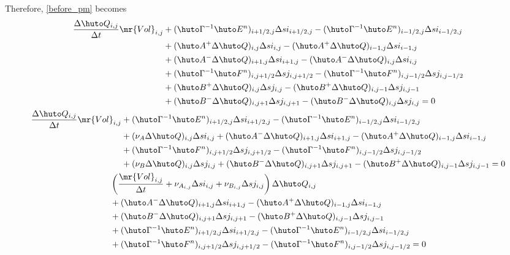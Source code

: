 \documentclass{jsarticle}
\newcommand{\bQ}{\huto Q}
\newcommand{\bE}{\huto E}
\newcommand{\bF}{\huto F}
\newcommand{\bA}{\huto A}
\newcommand{\bB}{\huto B}
\newcommand{\bG}{\huto \Gamma}
\newcommand{\Vol}{\mr{Vol}}
\begin{document}
Therefore, \eqref{before_pm} becomes
\begin{gather}
\begin{split}
\frac{\Delta \bQ _{i,j}}{\Delta t} \Vol _{i,j}
&+ (\bG ^{-1} \bE^n)_{i+1/2,j}\Delta si_{i+1/2,j} - (\bG ^{-1} \bE^n)_{i-1/2,j}\Delta si_{i-1/2,j}\\
&+ (\bA^+\Delta \bQ)_{i,  j}\Delta si_{i,  j} - (\bA^+\Delta \bQ)_{i-1,j}\Delta si_{i-1,j}\\
&+ (\bA^-\Delta \bQ)_{i+1,j}\Delta si_{i+1,j} - (\bA^-\Delta \bQ)_{i,  j}\Delta si_{i,  j}\\
&+ (\bG ^{-1} \bF^n)_{i,j+1/2}\Delta sj_{i,j+1/2} - (\bG ^{-1} \bF^n)_{i,j-1/2}\Delta sj_{i,j-1/2}\\
&+ (\bB^+\Delta \bQ)_{i,j  }\Delta sj_{i,j  } - (\bB^+\Delta \bQ)_{i,j-1}\Delta sj_{i,j-1}\\
&+ (\bB^-\Delta \bQ)_{i,j+1}\Delta sj_{i,j+1} - (\bB^-\Delta \bQ)_{i,j  }\Delta sj_{i,j  }=0\\
\end{split}\\
\begin{split}
\frac{\Delta \bQ _{i,j}}{\Delta t} \Vol _{i,j}
&+ (\bG ^{-1} \bE^n)_{i+1/2,j}\Delta si_{i+1/2,j} - (\bG ^{-1} \bE^n)_{i-1/2,j}\Delta si_{i-1/2,j}\\
&+ (\nu _A\Delta \bQ)_{i,  j}\Delta si_{i,  j} + (\bA^-\Delta \bQ)_{i+1,j}\Delta si_{i+1,j} - (\bA^+\Delta \bQ)_{i-1,j}\Delta si_{i-1,j}\\
&+ (\bG ^{-1} \bF^n)_{i,j+1/2}\Delta sj_{i,j+1/2} - (\bG ^{-1} \bF^n)_{i,j-1/2}\Delta sj_{i,j-1/2}\\
&+ (\nu _B\Delta \bQ)_{i,j  }\Delta sj_{i,j  } + (\bB^-\Delta \bQ)_{i,j+1}\Delta sj_{i,j+1} - (\bB^+\Delta \bQ)_{i,j-1}\Delta sj_{i,j-1}=0
\end{split}\\
\begin{split}
&\left( \frac{\Vol _{i,j}}{\Delta t} + \nu _{A_{i,j}}\Delta si_{i,j} + \nu _{B_{i,j  }}\Delta sj_{i,j  }\right) \Delta \bQ _{i,j}\\
&+ (\bA^-\Delta \bQ)_{i+1,j}\Delta si_{i+1,j} - (\bA^+\Delta \bQ)_{i-1,j}\Delta si_{i-1,j}\\
&+ (\bB^-\Delta \bQ)_{i,j+1}\Delta sj_{i,j+1} - (\bB^+\Delta \bQ)_{i,j-1}\Delta sj_{i,j-1}\\
&+ (\bG ^{-1} \bE^n)_{i+1/2,j}\Delta si_{i+1/2,j} - (\bG ^{-1} \bE^n)_{i-1/2,j}\Delta si_{i-1/2,j}\\
&+ (\bG ^{-1} \bF^n)_{i,j+1/2}\Delta sj_{i,j+1/2} - (\bG ^{-1} \bF^n)_{i,j-1/2}\Delta sj_{i,j-1/2}=0
\end{split}
\end{gather}
\end{document}
